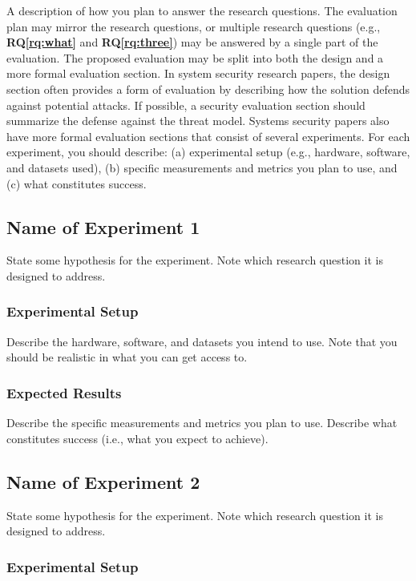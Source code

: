 \documentclass[10pt,twocolumn,pdftex]{article}
\newcommand{\rqref}[1]{\textbf{RQ\ref{#1}}}
\begin{document}
A description of how you plan to answer the research questions. The
evaluation plan may mirror the research questions, or multiple research
questions (e.g., \rqref{rq:what} and \rqref{rq:three}) may be answered by
a single part of the evaluation. The proposed evaluation may be split
into both the design and a more formal evaluation section. In system
security research papers, the design section often provides a form of
evaluation by describing how the solution defends against potential
attacks. If possible, a security evaluation section should summarize the
defense against the threat model. Systems security papers also have more
formal evaluation sections that consist of several experiments. For each
experiment, you should describe: (a) experimental setup (e.g., hardware,
software, and datasets used), (b) specific measurements and metrics you
plan to use, and (c) what constitutes success.

\subsection{Name of Experiment 1}

State some hypothesis for the experiment. Note which research question
it is designed to address.

\subsubsection{Experimental Setup}

Describe the hardware, software, and datasets you intend to use. Note
that you should be realistic in what you can get access to.

\subsubsection{Expected Results}

Describe the specific measurements and metrics you plan to use. Describe
what constitutes success (i.e., what you expect to achieve).

\subsection{Name of Experiment 2}

State some hypothesis for the experiment. Note which research question
it is designed to address.

\subsubsection{Experimental Setup}
\end{document}
